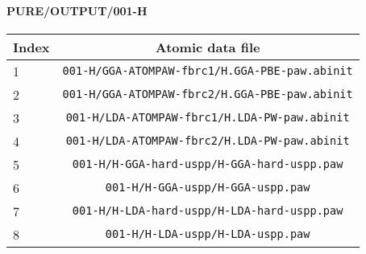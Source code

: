 \documentclass[onecolumn]{revtex4}
\begin{document}
\paragraph*{\bf{PURE/OUTPUT/001-H}}
\begin{center}
\begin{tabular}{lc}
\hline
Index & Atomic data file \\
\hline
1 & \verb?001-H/GGA-ATOMPAW-fbrc1/H.GGA-PBE-paw.abinit?\\
2 & \verb?001-H/GGA-ATOMPAW-fbrc2/H.GGA-PBE-paw.abinit?\\
3 & \verb?001-H/LDA-ATOMPAW-fbrc1/H.LDA-PW-paw.abinit?\\
4 & \verb?001-H/LDA-ATOMPAW-fbrc2/H.LDA-PW-paw.abinit?\\
5 & \verb?001-H/H-GGA-hard-uspp/H-GGA-hard-uspp.paw?\\
6 & \verb?001-H/H-GGA-uspp/H-GGA-uspp.paw?\\
7 & \verb?001-H/H-LDA-hard-uspp/H-LDA-hard-uspp.paw?\\
8 & \verb?001-H/H-LDA-uspp/H-LDA-uspp.paw?\\
\hline
\end{tabular}
\end{center}
\end{document}

